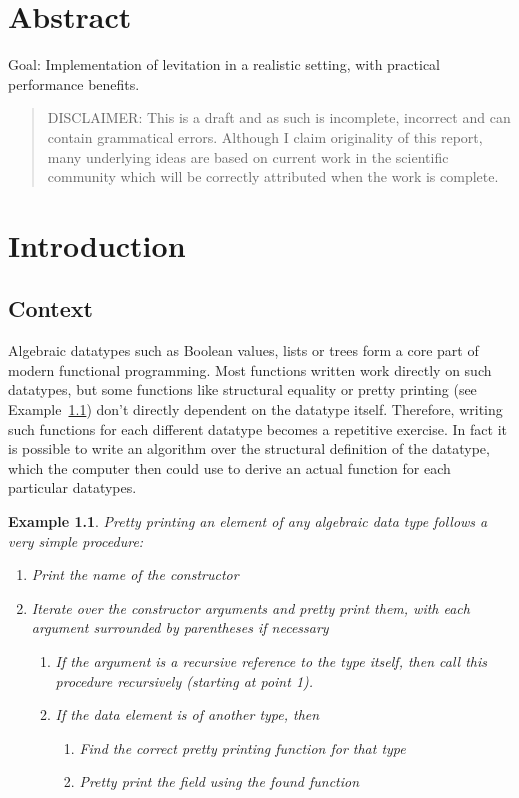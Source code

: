 \documentclass{ituthesis}
\theoremstyle{break}
\newtheorem{exmp}{Example}
\begin{document}

\frontmatter

\thetitlepage
\newpage

\chapter*{Abstract}
Goal: Implementation of levitation in a realistic setting, with practical performance benefits.
\blockquote{DISCLAIMER: This is a draft and as such is incomplete, incorrect and can contain grammatical errors.
Although I claim originality of this report, many underlying ideas are based on current work in the scientific community which will be correctly attributed
when the work is complete.}

\cleardoublepage
\setcounter{tocdepth}{1}
\tableofcontents

\mainmatter
\midsloppy
\sloppybottom
\chapter{Introduction}
\label{cha:Intoduction}
\section{Context}
\label{sec:Context}
Algebraic datatypes such as Boolean values, lists or trees form a core part of modern functional programming.
Most functions written work directly on such datatypes, but some functions like structural equality or pretty printing (see Example~\ref{exmp:prettyprint}) don't directly dependent on the datatype itself.
Therefore, writing such functions for each different datatype becomes a repetitive exercise.
In fact it is possible to write an algorithm over the structural definition of the datatype, which the computer then could use to derive an actual function for each particular datatypes.

\begin{exmp}
  Pretty printing an element of any algebraic data type follows a very simple procedure:
  \begin{enumerate}
    \item Print the name of the constructor
    \item Iterate over the constructor arguments and pretty print them, with each argument surrounded by parentheses if necessary
    \begin{enumerate}
      \item If the argument is a recursive reference to the type itself, then call this procedure recursively (starting at point 1).
      \item If the data element is of another type, then
      \begin{enumerate}
        \item Find the correct pretty printing function for that type
        \item Pretty print the field using the found function
      \end{enumerate}
    \end{enumerate}
  \end{enumerate}
  \label{exmp:prettyprint}
\end{exmp}
\end{document}
